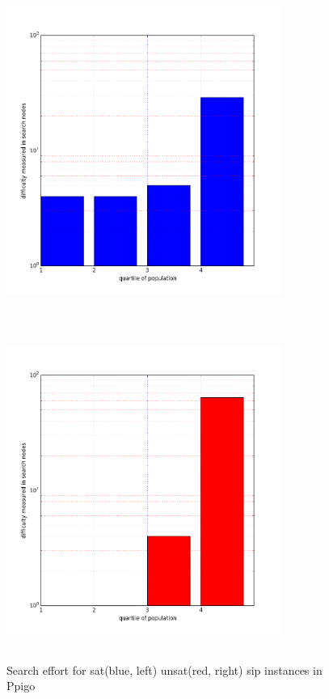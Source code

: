 \documentclass{l4proj}
\begin{document}
\begin{figure}
\centering
\begin{minipage}[t]{.5\textwidth}
  \centering
  \includegraphics[height=11cm,width=9cm]{images/plots/ppigoSAT.png}
\end{minipage}%
\begin{minipage}[t]{.5\textwidth}
  \centering
  \includegraphics[height=11cm,width=9cm]{images/plots/ppigoUNSAT.png}
\end{minipage}
\caption{Search effort for \gls{sat}(blue, left) \gls{unsat}(red, right) \gls{sip} instances in Ppigo}
\label{fig:ppigoSatUnsat}
\end{figure}
\end{document}
